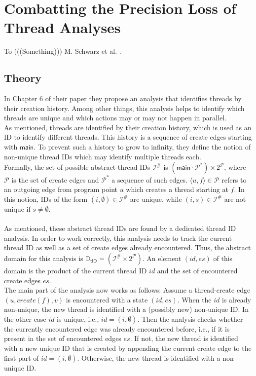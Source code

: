 
\chapter{Combatting the Precision Loss of Thread Analyses}\label{chapter:precisionLossThreadAnalyses}
  To (((Something))) M. Schwarz et al. \parencite{schwarz2023clustered}.
  \section{Theory}\label{sec:threadTheory}
  In Chapter 6 of their paper \parencite{schwarz2023clustered} they propose an analysis that identifies threads by their creation history. Among other things, this analysis helps to identify which threads are unique and which actions may or may not happen in parallel.\\
  As mentioned, threads are identified by their creation history, which is used as an ID to identify different threads. This history is a sequence of create edges starting with $\textsf{main}$. To prevent such a history to grow to infinity, they define the notion of non-unique thread IDs which may identify multiple threads each.\\
  Formally, the set of possible abstract thread IDs $\mathcal{I}^{\#}$ is $(\textsf{main}\cdot\mathcal{P}^*) \times 2^{\mathcal{P}}$, where $\mathcal{P}$ is the set of create edges and $\mathcal{P}^*$ a sequence of such edges. $\langle u, f \rangle \in \mathcal{P}$ refers to an outgoing edge from program point $u$ which creates a thread starting at $f$.
  In this notion, IDs of the form $(i, \emptyset) \in \mathcal{I}^{\#}$ are unique, while $(i, s) \in \mathcal{I}^{\#}$ are not unique if $s \neq \emptyset$.\\
  \\
  As mentioned, these abstract thread IDs are found by a dedicated thread ID analysis. In order to work correctly, this analysis needs to track the current thread ID as well as a set of create edges already encountered. Thus, the abstract domain for this analysis is $\mathbb{D}_\textsf{tID} = (\mathcal{I}^{\#} \times 2^{\mathcal{P}})$. An element $(id, es)$ of this domain is the product of the current thread ID $id$ and the set of encountered create edges $es$.\\
  The main part of the analysis now works as follows: Assume a thread-create edge $(u, create(f), v)$ is encountered with a state $(id, es)$. When the $id$ is already non-unique, the new thread is identified with a (possibly new) non-unique ID. In the other case $id$ is unique, i.e., $id = (i, \emptyset)$. Then the analysis checks whether the currently encountered edge was already encountered before, i.e., if it is present in the set of encountered edges $es$. If not, the new thread is identified with a new unique ID that is created by appending the current create edge to the first part of $id = (i, \emptyset)$. Otherwise, the new thread is identified with a non-unique ID.\\
